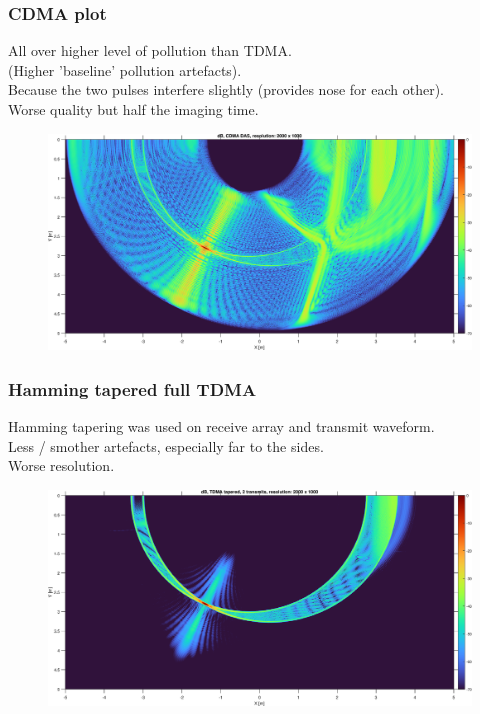 \documentclass{beamer}
\begin{document}
\begin{frame}
	\frametitle{CDMA plot}
	All over higher level of pollution than TDMA.\\
	(Higher 'baseline' pollution artefacts).\\
	Because the two pulses interfere slightly (provides nose for each other).\\
	Worse quality but half the imaging time.\\
	\begin{figure}
    	\includegraphics[scale=0.32]{cdma.eps}\\	
	\end{figure}
\end{frame}

\begin{frame}
	\frametitle{Hamming tapered full TDMA}
	Hamming tapering was used on receive array and transmit waveform.\\  	
	Less / smother artefacts, especially far to the sides.\\ 
	Worse resolution.\\
	\begin{figure}
    	\includegraphics[scale=0.33]{tdma_2t_tapered.eps}\\	
	\end{figure}
\end{frame}
\end{document}
